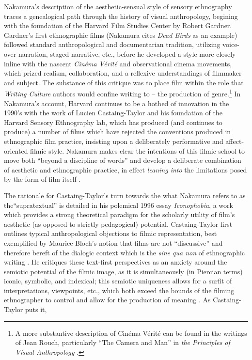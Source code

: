 Nakamura's description of the aesthetic-sensual style of sensory
ethnography traces a genealogical path through the history of visual
anthropology, begining with the foundation of the Harvard Film Studies
Center by Robert Gardner. Gardner's first ethnographic films (Nakamura
cites \emph{Dead Birds} as an example) followed standard anthropological
and documentarian tradition, utilizing voice-over narration, staged
narrative, etc., before he developed a style more closely inline with
the nascent \emph{Cinéma Vérité} and observational cinema movements,
which prized realism, collaboration, and a reflexive understandings of
filmmaker and subject. The substance of this critique was to place film
within the role that \emph{Writing Culture} authors would confine
writing to -- the production of genre.\footnote{A more substantive
  description of Cinéma Vérité can be found in the writings of Jean
  Rouch, particularly ``The Camera and Man'' in \emph{the Principles of
  Visual Anthropology} \autocite{rouch_camera_2009}.} In Nakamura's
account, Harvard continues to be a hotbed of innovation in the 1990's
with the work of Lucien Castaing-Taylor and his foundation of the
Harvard Sensory Ethnography lab, which has produced (and continues to
produce) a number of films which have rejected the conventions produced
in ethnographic film practice, insisting upon a deliberately
performative and affect-oriented filmic style. Nakamura makes clear the
intentions of this filmic school to move both ``beyond a discipline of
words'' and develop a deliberate combination of aesthetic and
ethnographic practice, in effect \emph{leaning into} the limitations
posed by the form of film itself
\autocite*[133-134]{nakamura_making_2013}.

The rationale for Castaing-Taylor's turn towards the what Nakamura
refers to as the``supratextual'' \autocite*[ 133]{nakamura_making_2013}
is detailed in his polemical 1996 essay \emph{Iconophobia}, a work which
provides a strong theoretical paradigm for the scholarly utility of
film's aesthetic (as opposed to strictly pedagogical) potential.
Castaing-Taylor first outlines typical anthropological objections to
filmic representation, best exemplified by Maurice Bloch's notion that
films are not ``discussive'' and therefore bereft of the dialogic
context which is the \emph{sine qua non} of ethnographic writing
\autocite[66]{taylor_iconophobia:_1996}. He critiques these text-first
perspectives as an anxiety around the semiotic potential of the filmic
image, as it is simultaneously (in Piercian terms) iconic, symbolic, and
indexical; this semiotic uniqueness allows for a surfit of
interpretations, viewpoints, etc., which both exceed the bounds of the
filming ethnographer to control and allow for the production of meaning
\autocite[75]{taylor_iconophobia:_1996}. As Castaing-Taylor puts it,

